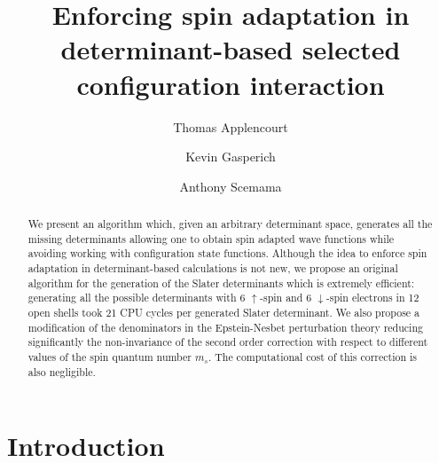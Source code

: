 \documentclass[aip,jcp,reprint,showkeys]{revtex4-1}
\newcommand{\up}{\uparrow}
\newcommand{\dn}{\downarrow}
\begin{document}
\title{Enforcing spin adaptation in determinant-based selected configuration
interaction}

\author{Thomas Applencourt}
\author{Kevin Gasperich}
\author{Anthony Scemama}

\begin{abstract}
We present an algorithm which, given an arbitrary determinant space, generates
all the missing determinants allowing one to obtain spin adapted wave
functions while avoiding working with configuration state functions.  Although
the idea to enforce spin adaptation in determinant-based calculations is not
new, we propose an original algorithm for the generation of the Slater
determinants which is extremely efficient: generating all the possible
determinants with 6 $\up$-spin and 6 $\dn$-spin electrons in 12 open shells
took 21 CPU cycles per generated Slater determinant. We also propose a
modification of the denominators in the Epstein-Nesbet perturbation theory
reducing significantly the non-invariance of the second order correction with
respect to different values of the spin quantum number $m_s$.  The
computational cost of this correction is also negligible.
\end{abstract}


\maketitle

\section{Introduction}
\end{document}
